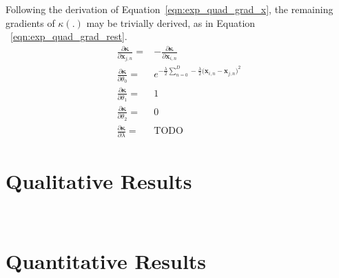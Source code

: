 Following the derivation of Equation~\ref{eqn:exp_quad_grad_x}, the remaining 
gradients of \( \kappa(.) \) may be trivially derived, as in Equation
~\ref{eqn:exp_quad_grad_rest}.
\begin{align}
  \label{eqn:exp_quad_grad_rest}
  \frac{\partial \bm{\kappa}}{\partial \bm{x}_{j, n}} ={}& 
  -\frac{\partial \bm{\kappa}}{\partial \bm{x}_{i, n}}\\
  \frac{\partial \bm{\kappa}}{\partial \theta_{0}} =&
  e^{-\frac{\lambda}{2} 
  \sum_{n = 0}^{D} -\frac{\lambda}{2} {\big( \bm{x}_{i, n} - \bm{x}_{j, n} \big)}^{2}}\\
  \frac{\partial \bm{\kappa}}{\partial \theta_{1}} =& 1\\
  \frac{\partial \bm{\kappa}}{\partial \theta_{2}} =& 0\\
  \frac{\partial \bm{\kappa}}{\partial \lambda} =& \text{TODO}
\end{align}

\section{Qualitative Results}
~\label{sec:spp_qualitative}

\section{Quantitative Results}
~\label{sec:spp_quantitative}